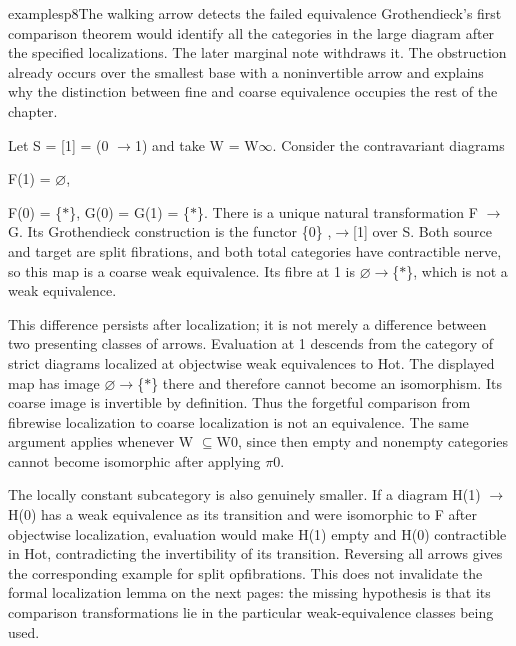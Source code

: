 \begin{dcomment}{examples}{p8}{The walking arrow detects the failed equivalence}
Grothendieck’s first comparison theorem would identify all the categories in the large diagram after the specified localizations. The later marginal note withdraws it. The obstruction already occurs over the smallest base with a noninvertible arrow and explains why the distinction between fine and coarse equivalence occupies the rest of the chapter.

Let S = [1] = (0 \ensuremath{\to}1) and take W = W\ensuremath{\infty}. Consider the contravariant diagrams

F(1) = \ensuremath{\varnothing},

F(0) = \{\ensuremath{*}\}, G(0) = G(1) = \{\ensuremath{*}\}. There is a unique natural transformation F \ensuremath{\to}G. Its Grothendieck construction is the functor \{0\} ,\ensuremath{\to}[1] over S. Both source and target are split fibrations, and both total categories have contractible nerve, so this map is a coarse weak equivalence. Its fibre at 1 is \ensuremath{\varnothing}\ensuremath{\to}\{\ensuremath{*}\}, which is not a weak equivalence.

This difference persists after localization; it is not merely a difference between two presenting classes of arrows. Evaluation at 1 descends from the category of strict diagrams localized at objectwise weak equivalences to Hot. The displayed map has image \ensuremath{\varnothing}\ensuremath{\to}\{\ensuremath{*}\} there and therefore cannot become an isomorphism. Its coarse image is invertible by definition. Thus the forgetful comparison from fibrewise localization to coarse localization is not an equivalence. The same argument applies whenever W \ensuremath{\subseteq}W0, since then empty and nonempty categories cannot become isomorphic after applying \ensuremath{\pi}0.

The locally constant subcategory is also genuinely smaller. If a diagram H(1) \ensuremath{\to}H(0) has a weak equivalence as its transition and were isomorphic to F after objectwise localization, evaluation would make H(1) empty and H(0) contractible in Hot, contradicting the invertibility of its transition. Reversing all arrows gives the corresponding example for split opfibrations. This does not invalidate the formal localization lemma on the next pages: the missing hypothesis is that its comparison transformations lie in the particular weak-equivalence classes being used.

\end{dcomment}

